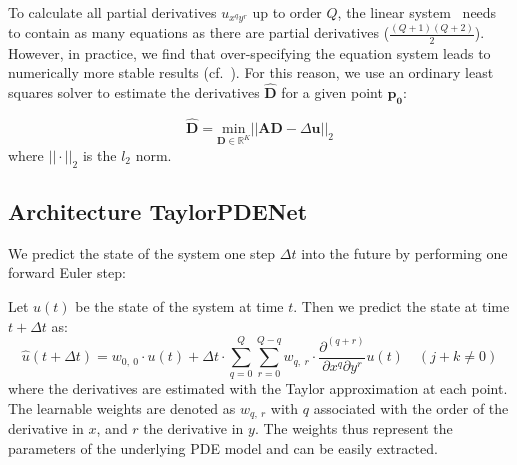 \documentclass[runningheads]{llncs}
\begin{document}
To calculate all partial derivatives $u_{x^qy^r}$ up to order $Q$, the linear system~ needs to contain as many equations as there are partial derivatives ($\frac{(Q+1)(Q+2)}{2}$). 
However, in practice, we find that over-specifying the equation system leads to numerically more stable results (cf.~).
For this reason, we use an ordinary least squares solver to estimate the derivatives $\widehat{\mathbf{D}}$ for a given point $\mathbf{p_0}$:

\begin{equation}
    \widehat{\mathbf{D}} = \underset{\mathbf{D} \in \mathbb{R}^K}{\mathrm{min}} || \mathbf{AD} -\Delta \mathbf{u} ||_2
\end{equation}
where $||\cdot||_2$ is the $l_2$ norm.

\subsection{Architecture TaylorPDENet}
We predict the state of the system one step $\Delta t$ into the future by performing one forward Euler step:

Let $u(t)$ be the state of the system at time $t$. 
Then we predict the state at time $t+ \Delta t$ as:
\begin{equation}\label{eq:prediction-step}
    \hat{u}(t+\Delta t) = w_{0, \:0}\cdot u(t) + \Delta t \cdot \sum_{q=0}^{Q} \sum_{r=0}^{Q-q} w_{q,\: r}\cdot \frac{\partial^{(q+r)}}{\partial x^q \partial y^r}u(t) \quad (j+k \neq 0)
\end{equation}
where the derivatives are estimated with the Taylor approximation at each point.
The learnable weights are denoted as $w_{q,\: r}$ with $q$ associated with the order of the derivative in $x$, and $r$ the derivative in $y$.
The weights thus represent the parameters of the underlying PDE model and can be easily extracted.
\end{document}
